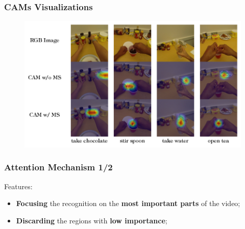 \documentclass{beamer}
\begin{document}
\begin{frame}
\frametitle{CAMs Visualizations}

\begin{figure}
\includegraphics[width=\textwidth]{../schemi/cams_img}
\end{figure}

\end{frame}

\begin{frame}
\frametitle{Attention Mechanism 1/2}

Features:
\begin{itemize}
\item \textbf{Focusing} the recognition on the \textbf{most important parts} of the video;
\item \textbf{Discarding} the regions with \textbf{low importance};
\end{itemize}

\end{frame}
\end{document}
